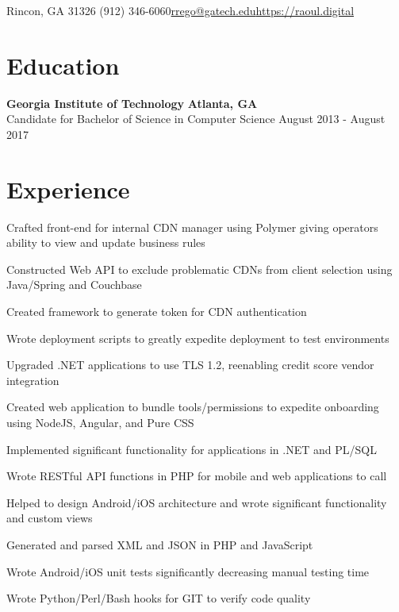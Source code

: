\documentclass[line]{resume}
\begin{document}
\begin{center}
	 {Rincon, GA 31326} {(912) 346-6060}{\href{mailto:rrego@gatech.edu}{rrego@gatech.edu}}{\href{https://raoul.digital}{https://raoul.digital}}
\end{center}
\section{Education}
\textbf{Georgia Institute of Technology} \hfill \textbf{Atlanta, GA} \\
Candidate for Bachelor of Science in Computer Science  \hfill August 2013 - August 2017
\section{Experience}
\begin{myitemize}
	\item Crafted front-end for internal CDN manager using Polymer giving operators ability to view and update business rules
	\item Constructed Web API to exclude problematic CDNs from client selection using Java/Spring and Couchbase
	\item Created framework to generate token for CDN authentication
\end{myitemize}

\begin{myitemize}
	\item Wrote deployment scripts to greatly expedite deployment to test environments
	\item Upgraded .NET applications to use TLS 1.2, reenabling credit score vendor integration
	\item Created web application to bundle tools/permissions to expedite onboarding using NodeJS, Angular, and Pure CSS
	\item Implemented significant functionality for applications in .NET and PL/SQL 
\end{myitemize}

\begin{myitemize}
	\item Wrote RESTful API functions in PHP for mobile and web applications to call 
	\item Helped to design Android/iOS architecture and wrote significant functionality and custom views
	\item Generated and parsed XML and JSON in PHP and JavaScript 
	\item Wrote Android/iOS unit tests significantly decreasing manual testing time 
	\item Wrote Python/Perl/Bash hooks for GIT to verify code quality
\end{myitemize}
\end{document}
